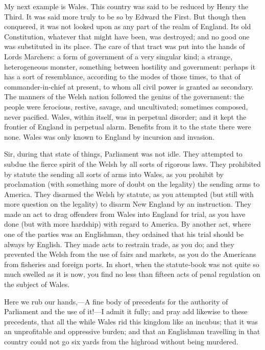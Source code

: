 My next example is Wales. This country was said to be reduced by Henry the Third. It was said more truly to be so by Edward the First. But though then conquered, it was not looked upon as any part of the realm of England. Its old Constitution, whatever that might have been, was destroyed; and no good one was substituted in its place. The care of that tract was put into the hands of Lords Marchers: a form of government of a very singular kind; a strange, heterogeneous monster, something between hostility and government: perhaps it has a sort of resemblance, according to the modes of those times, to that of commander-in-chief at present, to whom all civil power is granted as secondary. The manners of the Welsh nation followed the genius of the government: the people were ferocious, restive, savage, and uncultivated; sometimes composed, never pacified. Wales, within itself, was in perpetual disorder; and it kept the frontier of England in perpetual alarm. Benefits from it to the state there were none. Wales was only known to England by incursion and invasion.

Sir, during that state of things, Parliament was not idle. They attempted to subdue the fierce spirit of the Welsh by all sorts of rigorous laws. They prohibited by statute the sending all sorts of arms into Wales, as you prohibit by proclamation (with something more of doubt on the legality) the sending arms to America. They disarmed the Welsh by statute, as you attempted (but still with more question on the legality) to disarm New England by an instruction. They made an act to drag offenders from Wales into England for trial, as you have done (but with more hardship) with regard to America. By another act, where one of the parties was an Englishman, they ordained that his trial should be always by English. They made acts to restrain trade, as you do; and they prevented the Welsh from the use of fairs and markets, as you do the Americans from fisheries and foreign ports. In short, when the statute-book was not quite so much swelled as it is now, you find no less than fifteen acts of penal regulation on the subject of Wales.

Here we rub our hands,—A fine body of precedents for the authority of Parliament and the use of it!—I admit it fully; and pray add likewise to these precedents, that all the while Wales rid this kingdom like an incubus; that it was an unprofitable and oppressive burden; and that an Englishman travelling in that country could not go six yards from the highroad without being murdered.

